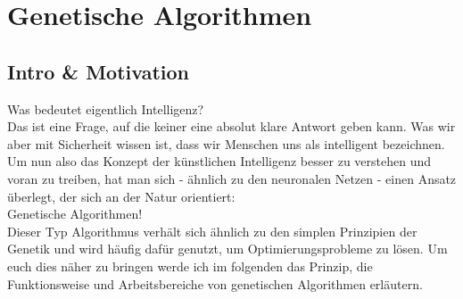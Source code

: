 \usetikzlibrary{calc}
\usetikzlibrary{positioning}
\usetikzlibrary{matrix}


\newtheorem{mydef}{Definition}
\newtheorem{algo}{Variante}

\chapter{Genetische Algorithmen}

\section{Intro \& Motivation}
Was bedeutet eigentlich Intelligenz?\\
Das ist eine Frage, auf die keiner eine absolut klare Antwort geben kann. Was wir aber mit Sicherheit wissen ist, dass wir Menschen uns als intelligent bezeichnen. Um nun also das Konzept der künstlichen Intelligenz besser zu verstehen und voran zu treiben, hat man sich - ähnlich zu den neuronalen Netzen - einen Ansatz überlegt, der sich an der Natur orientiert:\\
Genetische Algorithmen!\\
Dieser Typ Algorithmus verhält sich ähnlich zu den simplen Prinzipien der Genetik und wird häufig dafür genutzt, um Optimierungsprobleme zu lösen. Um euch dies näher zu bringen werde ich im folgenden das Prinzip, die Funktionsweise und Arbeitsbereiche von genetischen Algorithmen erläutern.\\

